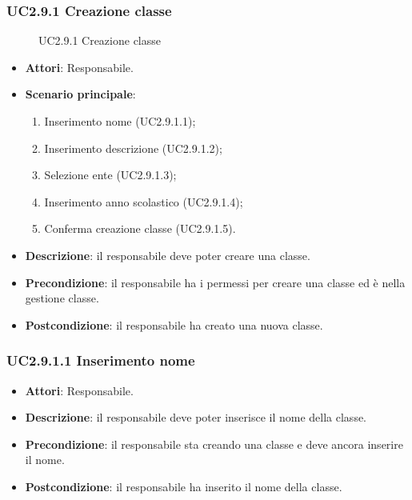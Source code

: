 \subsubsection{UC2.9.1 Creazione classe}
\begin{figure}[H]
\centering
\noindent{}
\caption{UC2.9.1 Creazione classe}
\end{figure}
\begin{itemize}
\item \textbf{Attori}: Responsabile.
\item \textbf{Scenario principale}:
\begin{enumerate}
\item Inserimento nome (UC2.9.1.1);
\item Inserimento descrizione (UC2.9.1.2);
\item Selezione ente (UC2.9.1.3);
\item Inserimento anno scolastico (UC2.9.1.4);
\item Conferma creazione classe (UC2.9.1.5).
\end{enumerate}
\item \textbf{Descrizione}: il responsabile deve poter creare una classe.
\item \textbf{Precondizione}: il responsabile ha i permessi per creare una classe ed è nella gestione classe.
\item \textbf{Postcondizione}: il responsabile ha creato una nuova classe.
\end{itemize}
\subsubsection{UC2.9.1.1 Inserimento nome}
\begin{itemize}
\item \textbf{Attori}: Responsabile.
\item \textbf{Descrizione}: il responsabile deve poter inserisce il nome della classe.
\item \textbf{Precondizione}: il responsabile sta creando una classe e deve ancora inserire il nome.
\item \textbf{Postcondizione}: il responsabile ha inserito il nome della classe.
\end{itemize}
